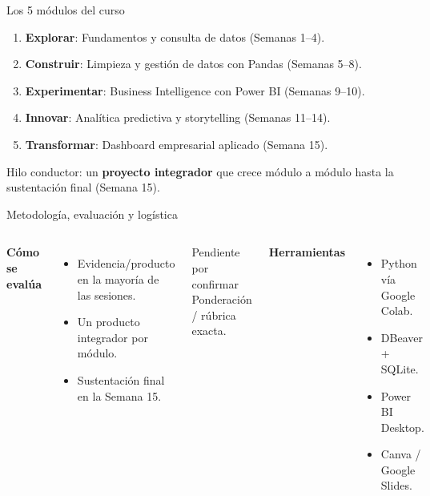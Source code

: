 \documentclass[aspectratio=169,11pt]{beamer}
\begin{document}
\begin{frame}{Los 5 módulos del curso}
  \begin{enumerate}
    \item \textbf{Explorar}: Fundamentos y consulta de datos (Semanas 1–4).
    \item \textbf{Construir}: Limpieza y gestión de datos con Pandas (Semanas 5–8).
    \item \textbf{Experimentar}: Business Intelligence con Power BI (Semanas 9–10).
    \item \textbf{Innovar}: Analítica predictiva y storytelling (Semanas 11–14).
    \item \textbf{Transformar}: Dashboard empresarial aplicado (Semana 15).
  \end{enumerate}
  \vspace{0.2cm}
  \small Hilo conductor: un \textbf{proyecto integrador} que crece módulo a
  módulo hasta la sustentación final (Semana 15).
\end{frame}

\begin{frame}{Metodología, evaluación y logística}
  \begin{columns}[T,onlytextwidth]
    \textbf{Cómo se evalúa}
    \begin{itemize}
      \small
      \item Evidencia/producto en la mayoría de las sesiones.
      \item Un producto integrador por módulo.
      \item Sustentación final en la Semana 15.
    \end{itemize}
    \begin{alertblock}{\small Pendiente por confirmar}
      \small Ponderación / rúbrica exacta.
    \end{alertblock}
    \textbf{Herramientas}
    \begin{itemize}
      \small
      \item Python vía Google Colab.
      \item DBeaver + SQLite.
      \item Power BI Desktop.
      \item Canva / Google Slides.
    \end{itemize}
  \end{columns}
\end{frame}
\end{document}
